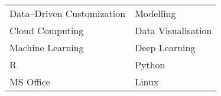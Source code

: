 \begin{center}
\begin{tabular}{ m{5cm} m{5cm} }
Data--Driven Customization & Modelling \\
Cloud Computing & Data Visualisation \\
Machine Learning & Deep Learning \\
R & Python \\
MS Office & Linux
\end{tabular}
\end{center}
